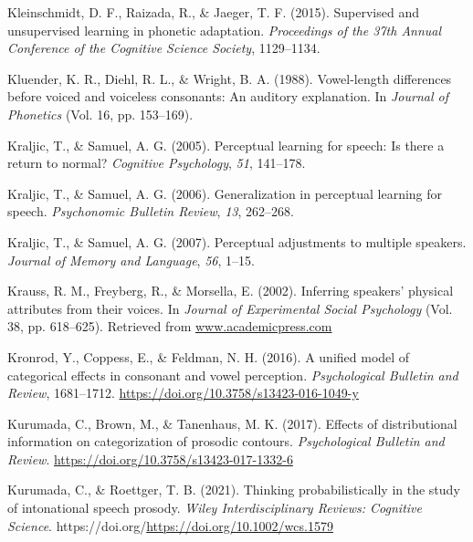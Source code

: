 \documentclass[
  11pt,
  english,
  man,floatsintext]{apa6}
\newlength{\cslhangindent}
\newlength{\cslentryspacingunit} %
\newenvironment{CSLReferences}[2] %
 {%
  \setlength{\parindent}{0pt}
  \ifodd #1
  \let\oldpar\par
  \def\par{\hangindent=\cslhangindent\oldpar}
  \fi
  \setlength{\parskip}{#2\cslentryspacingunit}
 }%
 {}
\begin{document}
\begin{CSLReferences}{1}{0}
\leavevmode{}%
Kleinschmidt, D. F., Raizada, R., \& Jaeger, T. F. (2015). Supervised and unsupervised learning in phonetic adaptation. \emph{Proceedings of the 37th Annual Conference of the Cognitive Science Society}, 1129--1134.

\leavevmode{}%
Kluender, K. R., Diehl, R. L., \& Wright, B. A. (1988). Vowel-length differences before voiced and voiceless consonants: An auditory explanation. In \emph{Journal of Phonetics} (Vol. 16, pp. 153--169).

\leavevmode{}%
Kraljic, T., \& Samuel, A. G. (2005). Perceptual learning for speech: Is there a return to normal? \emph{Cognitive Psychology}, \emph{51}, 141--178.

\leavevmode{}%
Kraljic, T., \& Samuel, A. G. (2006). Generalization in perceptual learning for speech. \emph{Psychonomic Bulletin Review}, \emph{13}, 262--268.

\leavevmode{}%
Kraljic, T., \& Samuel, A. G. (2007). Perceptual adjustments to multiple speakers. \emph{Journal of Memory and Language}, \emph{56}, 1--15.

\leavevmode{}%
Krauss, R. M., Freyberg, R., \& Morsella, E. (2002). Inferring speakers' physical attributes from their voices. In \emph{Journal of Experimental Social Psychology} (Vol. 38, pp. 618--625). Retrieved from \href{https://www.academicpress.com}{www.academicpress.com}

\leavevmode{}%
Kronrod, Y., Coppess, E., \& Feldman, N. H. (2016). A unified model of categorical effects in consonant and vowel perception. \emph{Psychological Bulletin and Review}, 1681--1712. \url{https://doi.org/10.3758/s13423-016-1049-y}

\leavevmode{}%
Kurumada, C., Brown, M., \& Tanenhaus, M. K. (2017). Effects of distributional information on categorization of prosodic contours. \emph{Psychological Bulletin and Review}. \url{https://doi.org/10.3758/s13423-017-1332-6}

\leavevmode{}%
Kurumada, C., \& Roettger, T. B. (2021). Thinking probabilistically in the study of intonational speech prosody. \emph{Wiley Interdisciplinary Reviews: Cognitive Science}. https://doi.org/\url{https://doi.org/10.1002/wcs.1579}


\end{CSLReferences}
\end{document}
